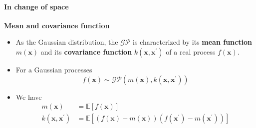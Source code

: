 \begin{frame}{\insertsubsection}
    \framesubtitle{In change of space}

    \textcolor{UniGold}{\textbf{Mean and covariance function}}
    \begin{itemize}
        \item As the Gaussian distribution, the $\mathcal{GP}$ is characterized by its \textcolor{UniOrange}{\textbf{mean function}} $m(\mathbf{x})$ and its \textcolor{UniOrange}{\textbf{covariance function}} $k(\mathbf{x,x}^{\prime})$ of a real process $f(\mathbf{x})$.
    \item For a Gaussian processes
    \begin{equation*}
        f(\mathbf{x})  \sim \mathcal{G} \mathcal{P}\left(m(\mathbf{x}), k\left(\mathbf{x}, \mathbf{x}^{\prime}\right)\right)
    \end{equation*}
    \item We have
    \begin{equation*}
    \begin{aligned} m(\mathbf{x}) &=\mathbb{E}[f(\mathbf{x})] \\ k\left(\mathbf{x}, \mathbf{x}^{\prime}\right) &=\mathbb{E}\left[(f(\mathbf{x})-m(\mathbf{x}))\left(f\left(\mathbf{x}^{\prime}\right)-m\left(\mathbf{x}^{\prime}\right)\right)\right] \end{aligned}        
    \end{equation*}
    \end{itemize}
\end{frame}